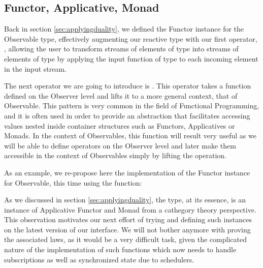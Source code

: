 \subsection{Functor, Applicative, Monad}

Back in section \ref{sec:applyingduality}, we defined the Functor instance for the Observable type, effectively augmenting our reactive type with our first operator, , allowing the user to transform streams of elements of type  into streams of elements of type  by applying the input function of type  to each incoming element in the input stream.

The next operator we are going to introduce is . This operator takes a function defined on the Observer level and lifts it to a more general context, that of Observable\cite{lift}. This pattern is very common in the field of Functional Programming, and it is often used in order to provide an abstraction that facilitates accessing values nested inside container structures such as Functors, Applicatives or Monads. In the context of Observables, this function will result very useful as we will be able to define operators on the Observer level and later make them accessible in the context of Observables simply by lifting the operation.


As an example, we re-propose here the implementation of the Functor instance for Observable, this time using the  function:


As we discussed in section \ref{sec:applyingduality}, the  type, at its essence, is an instance of Applicative Functor and Monad from a cathegory theory perspective. This observation motivates our next effort of trying and defining such instances on the latest version of our interface. We will not bother anymore with proving the associated laws, as it would be a very difficult task, given the complicated nature of the implementation of such functions which now needs to handle subscriptions as well as synchronized state due to schedulers.

